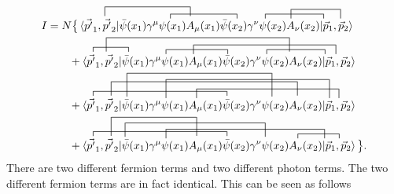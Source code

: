 \begin{example}
\begin{equation}
\begin{split}
			\contraction{,,,I=N\vec{p'},\vec{k'}|\bar{\psi}(x_1)\gamma^\mu}{,,\psi(x_1)}{A_\mu(x_1)}{\bar{\psi}(x_2)}
			\contraction{,,,,,,,,,,,,,,,,,,,,,,,,,,,,,,,,,,,,,,,,,,,}{\psi(x_2)}{,A_\nu(x_2)|}{\vec{p}}
			\contraction[2ex]{,,,,,,,,,,,,}{\vec{k'}}{,,,,,,,,,,,,,}{A_\mu(x_1)}
			\contraction[2ex]{,,,,.,,,,,,,,,,,,,,,,,,,,,,,,,,,,,,,,,,,,,,,,,,,}{A_\nu(x_2)}{,,,,,,}{\vec{k}}
			I&=N\big\{\braket{\vec{p'}_1,\vec{p'}_2|\bar{\psi}(x_1)\gamma^\mu\psi(x_1)A_\mu(x_1)\bar{\psi}(x_2)\gamma^\nu\psi(x_2)A_\nu(x_2)|\vec{p}_1,\vec{p}_2}\\
			&\qquad
			\contraction{,,,,}{\vec{p'}}{,,,\vec{k'}|}{\bar{\psi}}
			\contraction{,,,,,,,,,,,,,,,,,}{\psi(x_1)}{A_\mu(x_1)}{\bar{\psi}(x_2)}
			\contraction{,,,,,,,,,,,.,,,,,,,,,,,,,,,,,,,,,,,,,,}{\psi(x_2)}{,A_\nu(x_2)|}{\vec{p}}
			\contraction[3ex]{,,,,,.,}{\vec{k'}}{,,,,,,,,,,,,,,,,,,,,,,,,,,,,,,,,,}{A_\mu(x_2)}
			\contraction[2ex]{,,,,,,,,,,,,,,,,,,,,,,}{A_\nu(x_1)}{,,,,,,,,,,,,,,,,,,,,,,,,,}{\vec{k}}
			+\braket{\vec{p'}_1,\vec{p'}_2|\bar{\psi}(x_1)\gamma^\mu\psi(x_1)A_\mu(x_1)\bar{\psi}(x_2)\gamma^\nu\psi(x_2)A_\nu(x_2)|\vec{p}_1,\vec{p}_2}\\
			&\qquad
			\contraction{,,,,}{\vec{p'}}{,,,,,.,,,,,,,,,,,,,,,,,,}{\bar{\psi}(x_2)}
			\contraction[5ex]{,,,,,,,,,}{\bar{\psi}(x_1)}{,,,,,,,,,,,,,,,,,,,,,,,,}{\psi(x_2)}
			\contraction[4ex]{,,,,,,,,,,,,,,,,,}{\psi(x_1)}{,,,,,,,,,,,,,,,,,,,,,,,,,,,,,,}{\vec{p}}
			\contraction[3ex]{,,,,,.,,}{\vec{k'}}{,,,,,,,,,,,.,,,,,,,,,,,,,,,,,,,,,,}{A_\mu(x_2)}
			\contraction[2ex]{,,,,,.,,,,,,,,,,,,,,,,,}{A_\nu(x_1)}{,,,,,,,,,,,,,,,,,,,,,,,,,}{\vec{k}}
			+\braket{\vec{p'}_1,\vec{p'}_2|\bar{\psi}(x_1)\gamma^\mu\psi(x_1)A_\mu(x_1)\bar{\psi}(x_2)\gamma^\nu\psi(x_2)A_\nu(x_2)|\vec{p}_1,\vec{p}_2}\\	
			&\qquad
			\contraction{,,,,}{\vec{p'}}{,,,,.,,,,,,,,,,,,,,,,,,,}{\bar{\psi}(x_2)}
			\contraction[3ex]{,,,,,.,,,}{\bar{\psi}(x_1)}{,,,,,,,,,,,,,,,,,,,,,,,}{\psi(x_2)}
			\contraction[2ex]{,,,,,,,,,,,,,,,,,}{\psi(x_1)}{,,,,,,,,,,,,,,,,,,,,,,,,,,,,,}{\vec{p}}
			\contraction{,,,,,,,,,,,,,,,,,,,,,,,,,,,,,,,,,,,,,,,,,,,,}{\psi(x_2)}{,,,,,}{\vec{p}}
			\contraction[4ex]{,,,.,,,,}{\vec{k'}}{,,,,,,,,,,,,,}{A_\mu(x_1)}
			+\braket{\vec{p'}_1,\vec{p'}_2|\bar{\psi}(x_1)\gamma^\mu\psi(x_1)A_\mu(x_1)\bar{\psi}(x_2)\gamma^\nu\psi(x_2)A_\nu(x_2)|\vec{p}_1,\vec{p}_2}\big\}.\\
		\end{split}
		\label{I}
	\end{equation} 
	There are two different fermion terms and two different photon terms. The two different fermion terms are in fact identical. This can be seen as follows

\end{example}
